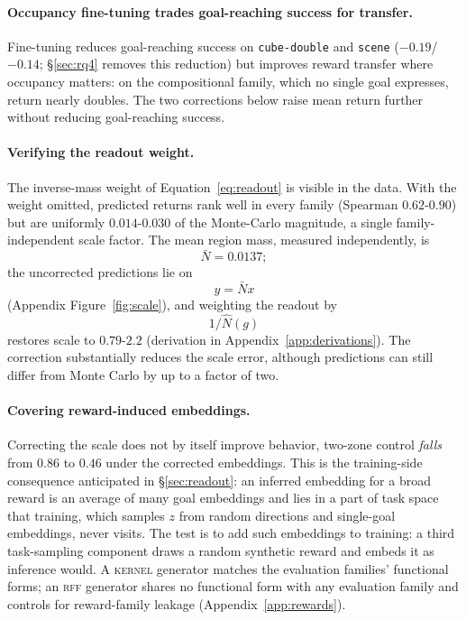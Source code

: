 \documentclass{article}
\newcommand{\Nhat}{\hat N}
\begin{document}
\paragraph{Occupancy fine-tuning trades goal-reaching success for transfer.}
Fine-tuning reduces goal-reaching success on \texttt{cube-double} and \texttt{scene} ($-0.19$/$-0.14$; \S\ref{sec:rq4} removes this reduction) but improves reward transfer where occupancy matters: on the compositional family, which no single goal expresses, return nearly doubles.
The two corrections below raise mean return further without reducing goal-reaching success.

\paragraph{Verifying the readout weight.}
The inverse-mass weight of Equation~\ref{eq:readout} is visible in the data.
With the weight omitted, predicted returns rank well in every family (Spearman $0.62$-$0.90$) but are uniformly $0.014$-$0.030$ of the Monte-Carlo magnitude, a single family-independent scale factor.
The mean region mass, measured independently, is
\begin{equation}
\bar N=0.0137;
\end{equation}
the uncorrected predictions lie on
\begin{equation}
y=\bar N x
\end{equation}
(Appendix Figure~\ref{fig:scale}), and weighting the readout by
\begin{equation}
1/\Nhat(g)
\end{equation}
restores scale to $0.79$-$2.2$ (derivation in Appendix~\ref{app:derivations}).
The correction substantially reduces the scale error, although predictions can still differ from Monte Carlo by up to a factor of two.

\paragraph{Covering reward-induced embeddings.}
Correcting the scale does not by itself improve behavior, two-zone control \emph{falls} from $0.86$ to $0.46$ under the corrected embeddings.
This is the training-side consequence anticipated in \S\ref{sec:readout}: an inferred embedding for a broad reward is an average of many goal embeddings and lies in a part of task space that training, which samples $z$ from random directions and single-goal embeddings, never visits.
The test is to add such embeddings to training: a third task-sampling component draws a random synthetic reward and embeds it as inference would.
A \textsc{kernel} generator matches the evaluation families' functional forms; an \textsc{rff} generator shares no functional form with any evaluation family and controls for reward-family leakage (Appendix~\ref{app:rewards}).
\end{document}
